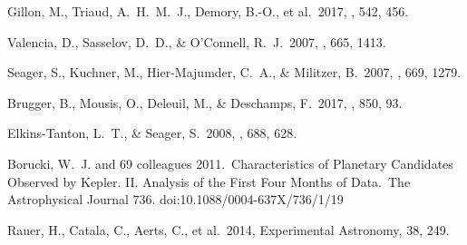 %
%
%
%
%
%







 Gillon, M., Triaud, A.~H.~M.~J., Demory, B.-O., et al.\ 2017, \nat, 542, 456.

 Valencia, D., Sasselov, D.~D., \& O'Connell, R.~J.\ 2007, \apj, 665, 1413.

 Seager, S., Kuchner, M., Hier-Majumder, C.~A., \& Militzer, B.\ 2007, \apj, 669, 1279.

 Brugger, B., Mousis, O., Deleuil, M., \& Deschamps, F.\ 2017, \apj, 850, 93.




 Elkins-Tanton, L.~T., \& Seager, S.\ 2008, \apj, 688, 628.



 Borucki, W.~J. and 69 colleagues 2011.\ Characteristics of Planetary Candidates Observed by Kepler. II. Analysis of the First Four Months of Data.\ The Astrophysical Journal 736. doi:10.1088/0004-637X/736/1/19

 Rauer, H., Catala, C., Aerts, C., et al.\ 2014, Experimental Astronomy, 38, 249.

